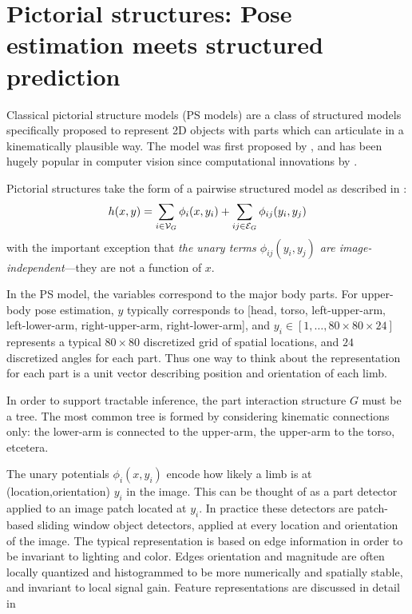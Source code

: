 \chapter{Pictorial structures: Pose estimation meets structured prediction} 
\label{sec:ps}
Classical pictorial structure models (PS models) are a class of structured 
models specifically proposed to represent 2D objects with parts which can 
articulate in a kinematically plausible way.  The model was first proposed by 
\citet{fischler1973ps}, and has been hugely popular in computer vision since 
computational innovations by \citet{felz05}.

Pictorial structures take the form of a pairwise structured model as described 
in :
\begin{equation}
h(x,y) = \sum_{i \in \mathcal{V}_G} \phi_i(x,y_i) + \sum_{ij \in \mathcal{E}_G} 
\label{eq:standard-ps}
\phi_{ij}(y_i,y_j)
\end{equation}
with the important exception that {\em the unary terms $\phi_{ij}(y_i,y_j)$ are 
image-independent}---they are not a function of $x$.

In the PS model, the variables correspond to the major body parts.  For 
upper-body pose estimation, $y$ typically corresponds to [head, torso, 
left-upper-arm, left-lower-arm, right-upper-arm, right-lower-arm], and $y_i \in 
[1,\ldots,80\times 80 \times 24]$ represents a typical $80 \times 80$ 
discretized grid of spatial locations, and $24$ discretized angles for each 
part.  Thus one way to think about the representation for each part is a unit 
vector describing position and orientation of each limb. 

 In order to support tractable inference, the part 
interaction structure $G$ must be a tree.  The most common tree is formed by 
considering kinematic connections only: the lower-arm is connected to the 
upper-arm, the upper-arm to the torso, etcetera.

 The unary potentials $\phi_i(x,y_i)$ encode how likely a limb is 
at (location,orientation) $y_i$ in the image.  This can be thought of as a part 
detector applied to an image patch located at $y_i$.  In practice these 
detectors are patch-based sliding window object detectors, applied at every 
location and orientation of the image.  The typical representation is based on 
edge information in order to be invariant to lighting and color. Edges 
orientation and magnitude are often locally quantized and histogrammed to be 
more numerically and spatially stable, and invariant to local signal gain.  
Feature representations are discussed in detail in 

